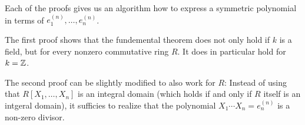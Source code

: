 \begin{remark}
  Each of the proofs gives us an algorithm how to express a symmetric polynomial in terms of $e^{(n)}_1, \dotsc, e^{(n)}_n$.
\end{remark}


\begin{remark}
  The first proof shows that the fundemental theorem does not only hold if $k$ is a field, but for every nonzero commutative ring $R$.
  It does in particular hold for $k = \mathbb{Z}$.
  
  The second proof can be slightly modified to also work for $R$:
  Instead of using that $R[X_1, \dotsc, X_n]$ is an integral domain (which holds if and only if $R$ itself is an intgeral domain), it sufficies to realize that the polynomial $X_1 \dotsm X_n = e^{(n)}_n$ is a non-zero divisor.
\end{remark}


